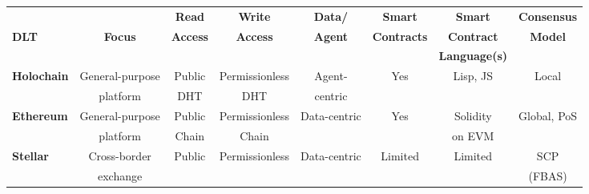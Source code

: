 \begin{table}
\small
\begin{centering}
{\begin{tabular}{| l | c | c | c | c | c | c | c |}
\hline
				& 				& \textbf{Read}			& \textbf{Write}		& \textbf{Data/} 
				& \textbf{Smart}		& \textbf{Smart}			&\textbf{Consensus}\\
\textbf{DLT}		&\textbf{Focus}  	& \textbf{Access} 		& \textbf{Access}	& \textbf{Agent} 
				& \textbf{Contracts} 	& \textbf{Contract}		&\textbf{Model} \\
				& 				& \textbf{} 				& \textbf{} 			& \textbf{} 
				& \textbf{} 			& \textbf{Language(s)}	&\textbf{}  \\
\hline
\hline
\textbf{Holochain}	&General-purpose 			&Public		&Permissionless	&Agent-	&Yes		&Lisp, JS
				&Local 				\\
				&platform 					&DHT		&DHT			&centric	&		&
				& 					\\
\hline
\textbf{Ethereum}	&General-purpose		&Public		&Permissionless	&Data-centric	&Yes		&Solidity	
				&Global, PoS 			 \\
				&platform 				&Chain		&Chain			&			&		&on EVM	
				& 					 \\
\hline
\textbf{Stellar}		&Cross-border 					&Public		&Permissionless	&Data-centric	&Limited	&Limited
				&SCP 				\\
				&exchange 					&			&				&			&		&
				&(FBAS)				\\
\hline


\end{tabular}}
\end{centering}
\end{table}
